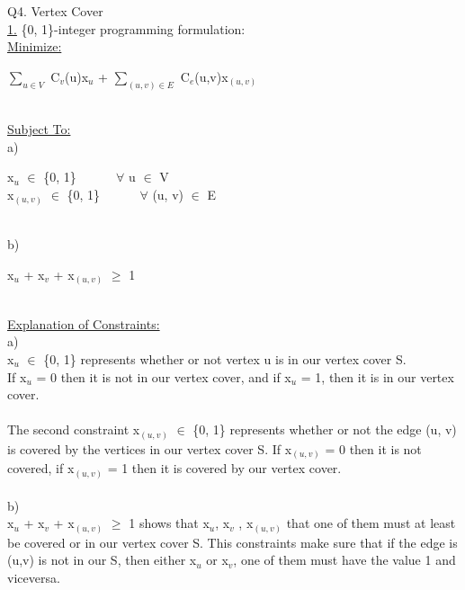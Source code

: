 \documentclass[10pt]{csc_assignment}
\begin{document}
\begin{description}
\begin{flushleft}
\newpage
\item[Q4. Vertex Cover]
~\\
\underline{1.} \{0, 1\}-integer programming formulation:\\
\underline{Minimize:}\\
\hspace*{1cm}\parbox{15cm}{
$\sum_{u \in V}$ C$_{v}$(u)x$_{u}$ + $\sum_{(u, v) \in E}$ C$_{e}$(u,v)x$_{(u, v)}$
}\\
\underline{Subject To:}\\
a) \\
\hspace*{1cm}\parbox{15cm}{
x$_{u}$ $\in$ \{0, 1\} ~~~~~ $\forall$ u $\in$ V\\ 
x$_{(u, v)}$ $\in$ \{0, 1\} ~~~~~ $\forall$ (u, v) $\in$ E\\ 
}\\
b)\\
\hspace*{1cm}\parbox{15cm}{
x$_{u}$ + x$_{v}$ + x$_{(u, v)}$ $\geqslant$ 1\\
}\\
\underline{Explanation of Constraints:}\\

a)\\
 x$_{u}$ $\in$ \{0, 1\} represents whether or not vertex u is  in our vertex cover S.\\
 If x$_{u}$ = 0 then it is not in our vertex cover, and if x$_{u}$ = 1, then it is in our vertex cover.\\
~\\
The second constraint x$_{(u, v)}$ $\in$ \{0, 1\} represents whether or not the edge (u, v) is covered by the vertices in our vertex cover S. If x$_{(u, v)}$ = 0 then it is not covered, if x$_{(u, v)}$ = 1 then it is covered by our vertex cover.\\
~\\
b)\\
 x$_{u}$ + x$_{v}$ + x$_{(u, v)}$ $\geqslant$ 1 shows that x$_{u}$, x$_{v}$ , x$_{(u, v)}$ that one of them must at least be covered or in our vertex cover S. This constraints make sure that if the edge is (u,v) is not in our S, then either x$_{u}$ or x$_{v}$, one of them must have the value 1 and viceversa.\\
~\\


\end{flushleft}
\end{description}
\end{document}

